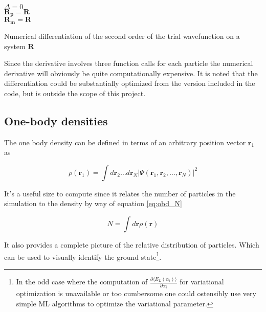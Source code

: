 \begin{algorithm}
\BlankLine
$\Delta = 0$ \\
$\mathbf{R_p} = \mathbf{R}$\\
$\mathbf{R_m} = \mathbf{R}$\\
\BlankLine
{}
\BlankLine
\caption{Numerical differentiation of the second order of the trial wavefunction on a system $\mathbf{R}$}\label{alg:nd}
\end{algorithm} 

Since the derivative involves three function calls for each particle the numerical derivative will obviously be quite computationally expensive. It is noted  that the differentiation could be substantially optimized from the version included in the code, but is outside the scope of this project. 


\subsection{One-body densities}
The one body density can be defined in terms of an arbitrary position vector $\mathbf{r}_1$ as 

\begin{equation}\label{eq:obd}
\rho(\mathbf{r}_1) = \int d\mathbf{r}_2 \ldots d\mathbf{r}_N |\Psi(\mathbf{r}_1, \mathbf{r}_2, \ldots, \mathbf{r}_N)|^2
\end{equation}

It's a useful size to compute since it relates the number of particles in the simulation to the density by way of equation \ref{eq:obd_N}

\begin{equation}\label{eq:obd_N}
N = \int d\mathbf{r}\rho(\mathbf{r})
\end{equation}

It also provides a complete picture of the relative distribution of particles. Which can be used to visually identify the ground state\footnote{In the odd case where the computation of $\frac{\partial \langle E_L (\alpha_i) \rangle}{\partial \alpha_i}$ for variational optimization is unavailable or too cumbersome one could ostensibly use very simple ML algorithms to optimize the variational parameter.}. 